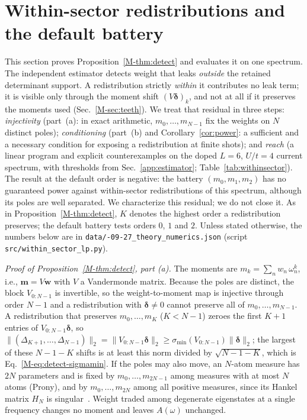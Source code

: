 \documentclass[aps,prb,onecolumn,superscriptaddress,longbibliography,floatfix]{revtex4-2}
\begin{document}
\section{Within-sector redistributions and the default battery}
\label{app:withinsector}
This section proves Proposition~\ref{M-thm:detect} and evaluates it on one spectrum. The independent estimator detects weight that leaks \emph{outside} the retained determinant support. A redistribution strictly \emph{within} it contributes no leak term; it is visible only through the moment shift $(V\bm{\delta})_k$, and not at all if it preserves the moments used (Sec.~\ref{M-sec:teeth}). We treat that residual in three steps: \emph{injectivity} (part~(a): in exact arithmetic, $m_0,\dots,m_{N-1}$ fix the weights on $N$ distinct poles); \emph{conditioning} (part~(b) and Corollary~\ref{cor:power}: a sufficient and a necessary condition for exposing a redistribution at finite shots); and \emph{reach} (a linear program and explicit counterexamples on the doped $L=6$, $U/t=4$ current spectrum, with thresholds from Sec.~\ref{app:estimator}; Table~\ref{tab:withinsector}). The result at the default order is negative: the battery $(m_0,m_1,m_2)$ has no guaranteed power against within-sector redistributions of this spectrum, although its poles are well separated. We characterize this residual; we do not close it. As in Proposition~\ref{M-thm:detect}, $K$ denotes the highest order a redistribution preserves; the default battery tests orders $0$, $1$ and $2$. Unless stated otherwise, the numbers below are in \texttt{data/-09-27\_theory\_numerics.json} (script \texttt{src/\allowbreak within\_sector\_lp.py}).

\emph{Proof of Proposition~\ref{M-thm:detect}, part (a).} The moments are $m_k=\sum_n w_n\,\omega_n^{k}$, i.e., $\mathbf{m}=V\mathbf{w}$ with $V$ a Vandermonde matrix. Because the poles are distinct, the block $V_{0:N-1}$ is invertible, so the weight-to-moment map is injective through order $N-1$ and a redistribution with $\bm{\delta}\neq0$ cannot preserve all of $m_0,\dots,m_{N-1}$. A redistribution that preserves $m_0,\dots,m_K$ ($K<N-1$) zeroes the first $K{+}1$ entries of $V_{0:N-1}\bm{\delta}$, so $\|(\Delta_{K+1},\dots,\Delta_{N-1})\|_2=\|V_{0:N-1}\bm{\delta}\|_2\ge\sigma_{\min}(V_{0:N-1})\|\bm{\delta}\|_2$; the largest of these $N{-}1{-}K$ shifts is at least this norm divided by $\sqrt{N-1-K}$, which is Eq.~\eqref{M-eq:detect-sigmamin}. If the poles may also move, an $N$-atom measure has $2N$ parameters and is fixed by $m_0,\dots,m_{2N-1}$ among measures with at most $N$ atoms (Prony), and by $m_0,\dots,m_{2N}$ among all positive measures, since its Hankel matrix $H_N$ is singular~\cite{ShohatTamarkin1943,PottsTasche2013}. Weight traded among degenerate eigenstates at a single frequency changes no moment and leaves $A(\omega)$ unchanged.
\end{document}
